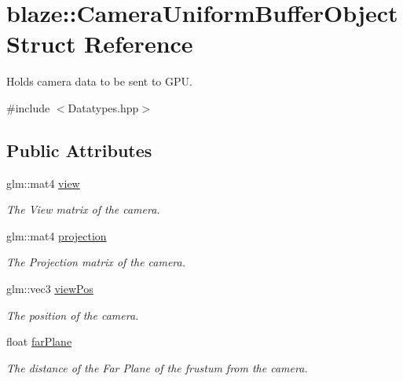 \hypertarget{structblaze_1_1CameraUniformBufferObject}{}\section{blaze\+:\+:Camera\+Uniform\+Buffer\+Object Struct Reference}
\label{structblaze_1_1CameraUniformBufferObject}


Holds camera data to be sent to G\+PU.  




{\ttfamily \#include $<$Datatypes.\+hpp$>$}

\subsection*{Public Attributes}
\begin{DoxyCompactItemize}
\item 
\mbox{\label{structblaze_1_1CameraUniformBufferObject_a7decac786bd55791d98b1c5199032ae3}} 
glm\+::mat4 \hyperlink{structblaze_1_1CameraUniformBufferObject_a7decac786bd55791d98b1c5199032ae3}{view}
\begin{DoxyCompactList}\small\item\em The View matrix of the camera. \end{DoxyCompactList}\item 
\mbox{\label{structblaze_1_1CameraUniformBufferObject_ac7d37d5dc539a9847870f07df21af4ba}} 
glm\+::mat4 \hyperlink{structblaze_1_1CameraUniformBufferObject_ac7d37d5dc539a9847870f07df21af4ba}{projection}
\begin{DoxyCompactList}\small\item\em The Projection matrix of the camera. \end{DoxyCompactList}\item 
\mbox{\label{structblaze_1_1CameraUniformBufferObject_ab2c45cccc835fb1fe748133bdfed917f}} 
glm\+::vec3 \hyperlink{structblaze_1_1CameraUniformBufferObject_ab2c45cccc835fb1fe748133bdfed917f}{view\+Pos}
\begin{DoxyCompactList}\small\item\em The position of the camera. \end{DoxyCompactList}\item 
\mbox{\label{structblaze_1_1CameraUniformBufferObject_aef0f1e82943b234286cc86adf306f6c5}} 
float \hyperlink{structblaze_1_1CameraUniformBufferObject_aef0f1e82943b234286cc86adf306f6c5}{far\+Plane}
\begin{DoxyCompactList}\small\item\em The distance of the Far Plane of the frustum from the camera. \end{DoxyCompactList}\end{DoxyCompactItemize}


